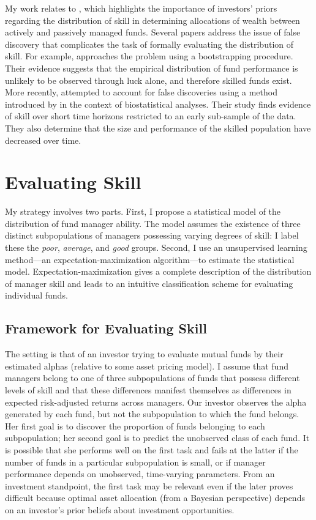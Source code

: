 	My work relates to \citet{Baks2001}, which highlights the importance of investors' priors regarding the distribution of skill in determining allocations of wealth between actively and passively managed funds. Several papers address the issue of false discovery that complicates the task of formally evaluating the distribution of skill. For example, \citet{Kosowski2006} approaches the problem using a bootstrapping procedure. Their evidence suggests that the empirical distribution of fund performance is unlikely to be observed through luck alone, and therefore skilled funds exist. More recently, \citet{Barras2010} attempted to account for false discoveries using a method introduced by \citet{Storey2002} in the context of biostatistical analyses. Their study finds evidence of skill over short time horizons restricted to an early sub-sample of the data. They also determine that the size and performance of the skilled population have decreased over time.


\section{Evaluating Skill}
	My strategy involves two parts.  First, I propose a statistical model of the distribution of fund manager ability.  The model assumes the existence of three distinct subpopulations of managers possessing varying degrees of skill: I label these the \textit{poor}, \textit{average}, and \textit{good} groups. Second, I use an unsupervised learning method---an expectation-maximization algorithm---to estimate the statistical model.  Expectation-maximization gives a complete description of the distribution of manager skill and leads to an intuitive classification scheme for evaluating individual funds.

	\subsection{Framework for Evaluating Skill}
		The setting is that of an investor trying to evaluate mutual funds by their estimated alphas (relative to some asset pricing model). I assume that fund managers belong to one of three subpopulations of funds that possess different levels of skill and that these differences manifest themselves as differences in expected risk-adjusted returns across managers. Our investor observes the alpha generated by each fund, but not the subpopulation to which the fund belongs. Her first goal is to discover the proportion of funds belonging to each subpopulation; her second goal is to predict the unobserved class of each fund. It is possible that she performs well on the first task and fails at the latter if the number of funds in a particular subpopulation is small, or if manager performance depends on unobserved, time-varying parameters. From an investment standpoint, the first task may be relevant even if the later proves difficult because optimal asset allocation (from a Bayesian perspective) depends on an investor's prior beliefs about investment opportunities.

